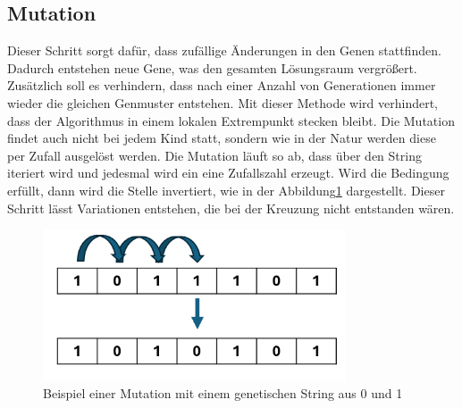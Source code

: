 %
%
%
%
\subsection{Mutation
\label{buch:paper:varalg:subsection:mutation}}
Dieser Schritt sorgt dafür, dass zufällige Änderungen in 
den Genen stattfinden. Dadurch entstehen neue Gene, was den 
gesamten Lösungsraum vergrößert. Zusätzlich soll es verhindern,
dass nach einer Anzahl von Generationen immer wieder die
gleichen Genmuster entstehen. Mit dieser Methode wird
verhindert, dass der Algorithmus in einem lokalen Extrempunkt
stecken bleibt. Die Mutation findet auch nicht bei jedem Kind
statt, sondern wie in der Natur werden diese per Zufall
ausgelöst werden. Die Mutation läuft so ab, dass über den String
iteriert wird und jedesmal wird ein eine Zufallszahl erzeugt. Wird 
die Bedingung erfüllt, dann wird die Stelle invertiert, wie in der
Abbildung\ref{fig:mutation_genetic_string} dargestellt. Dieser Schritt 
lässt Variationen entstehen, die bei der Kreuzung nicht entstanden wären.  
\begin{figure}
	\centering
	\includegraphics[width=0.8\textwidth]{
        papers/varalg/images/teil3/09GeneticStringMutation.png
        }
	\caption{Beispiel einer Mutation mit einem genetischen String aus 0 und 1}
	\label{fig:mutation_genetic_string}
\end{figure}

